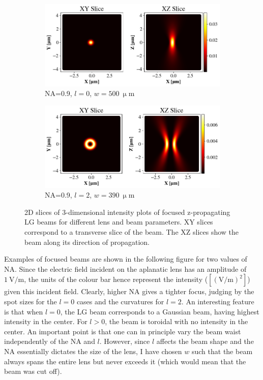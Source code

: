 \begin{figure}
    \begin{subfigure}[b]{0.49\textwidth}
        \includegraphics[width=\textwidth]{Figures/Efoc_NA9_l0.png}
        \caption{NA=0.9, \( l=0 \), \( w=500\ \mathrm{\upmu m} \)}
        \label{fig:c}
    \end{subfigure}
    \begin{subfigure}[b]{0.49\textwidth}
        \includegraphics[width=\textwidth]{Figures/Efoc_NA9_l2.png}
        \caption{NA=0.9, \( l=2 \), \( w=390\ \mathrm{\upmu m} \)}
        \label{fig:d}
    \end{subfigure}

    \caption{2D slices of 3-dimensional intensity plots of focused z-propagating LG beams for different lens and beam parameters. XY slices correspond to a transverse slice of the beam. The XZ slices show the beam along its direction of propagation.}
    \label{fig:Efoc}
\end{figure}

Examples of focused beams are shown in the following figure for two values of NA. Since the electric field incident on the aplanatic lens has an amplitude of $1\ \mathrm{V/m}$, the units of the colour bar hence represent the intensity ($[(\mathrm{V/m})^2]$) given this incident field.
Clearly, higher NA gives a tighter focus, judging by the spot sizes for the \( l=0 \) cases and the curvatures for \( l=2 \). 
An interesting feature is that when \( l=0 \), the LG beam corresponds to a Gaussian beam, having highest intensity in the center. For \( l > 0 \), the beam is toroidal with no intensity in the center. 
An important point is that one can in principle vary the beam waist independently of the NA and \( l \). However, since \( l \) affects the beam shape and the NA essentially dictates the size of the lens, I have chosen \( w \) such that the beam always spans the entire lens but never exceeds it (which would mean that the beam was cut off).

